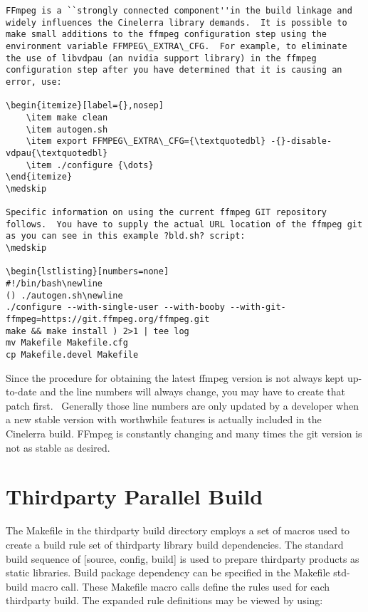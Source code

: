 \begin{lstlisting}[numbers=none]
FFmpeg is a ``strongly connected component''in the build linkage and widely influences the Cinelerra library demands.  It is possible to make small additions to the ffmpeg configuration step using the environment variable FFMPEG\_EXTRA\_CFG.  For example, to eliminate the use of libvdpau (an nvidia support library) in the ffmpeg configuration step after you have determined that it is causing an error, use:

\begin{itemize}[label={},nosep]
	\item make clean
	\item autogen.sh
	\item export FFMPEG\_EXTRA\_CFG={\textquotedbl} -{}-disable-vdpau{\textquotedbl} 
	\item ./configure {\dots}
\end{itemize}
\medskip

Specific information on using the current ffmpeg GIT repository follows.  You have to supply the actual URL location of the ffmpeg git as you can see in this example ?bld.sh? script:
\medskip

\begin{lstlisting}[numbers=none]
#!/bin/bash\newline
() ./autogen.sh\newline
./configure --with-single-user --with-booby --with-git-ffmpeg=https://git.ffmpeg.org/ffmpeg.git
make && make install ) 2>1 | tee log
mv Makefile Makefile.cfg
cp Makefile.devel Makefile
\end{lstlisting}

Since the procedure for obtaining the latest ffmpeg version is not always kept up-to-date and the line numbers will always change, you may have to create that patch first. \ Generally those line numbers are only updated by a developer when a new stable version with worthwhile features is actually included in the Cinelerra build. FFmpeg is constantly changing and many times the git version is not as stable as desired.

\section{Thirdparty Parallel Build}
\label{sec:Thirdparty Parallel Build}

The Makefile in the thirdparty build directory employs a set of macros used to create a build rule set of thirdparty library build dependencies.  The standard build sequence of [source, config, build] is used to prepare thirdparty products as static libraries.  Build package dependency can be specified in the Makefile std-build macro call.  These Makefile macro calls define the rules used for each thirdparty build.  The expanded rule definitions may be viewed by using:
\smallskip

